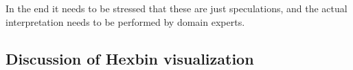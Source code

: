 In the end it needs to be stressed that these are just speculations, and the actual interpretation needs to be performed by domain experts. 


\subsection{Discussion of Hexbin visualization}


